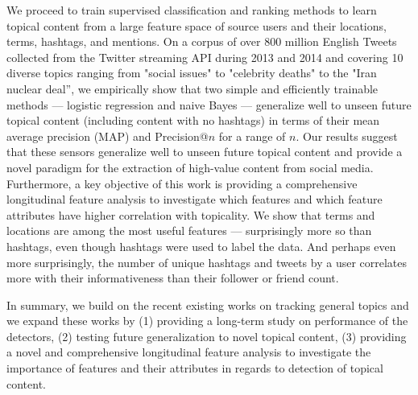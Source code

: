 We proceed to train supervised classification and ranking methods
to learn topical content from a large feature space of source users
and their locations, terms, hashtags, and mentions.  On a corpus of
over 800 million English Tweets collected from the Twitter streaming
API during 2013 and 2014 and covering 10 diverse topics ranging from
"social issues" to "celebrity deaths" to the "Iran nuclear deal'', we
empirically show that two simple and efficiently trainable methods ---
logistic regression and naive Bayes --- generalize well to unseen
future topical content (including content with no hashtags) in terms
of their mean average precision (MAP) and Precision@$n$ for a range of
$n$. Our results suggest that these
sensors generalize well to unseen future topical content and provide a
novel paradigm for the extraction of high-value content from social
media. 
Furthermore, a key objective of this work is providing a comprehensive longitudinal feature analysis to investigate which features and which feature attributes have higher correlation with topicality. We show that terms and locations are among the most
useful features --- surprisingly more so than hashtags, even though
hashtags were used to label the data.  And perhaps even more
surprisingly, the number of unique hashtags and tweets by a user
correlates more with their informativeness than their follower or
friend count.
 
In summary, we build on the recent existing works on tracking general topics and we expand these works by (1) providing a long-term study on performance of the detectors, (2) testing future generalization to novel topical content, (3) providing a novel and comprehensive longitudinal feature analysis to investigate the importance of features and their attributes in regards to detection of topical content. 

